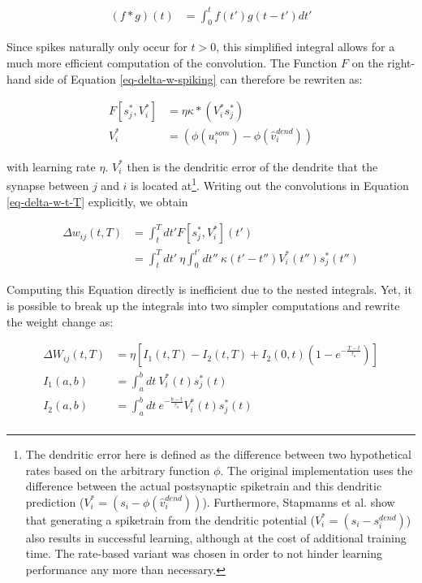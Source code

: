 \begin{align}
  (f \ast g)(t) & = \int_{0}^{t} f(t') g(t-t') d t'
\end{align}

Since spikes naturally only occur for $t>0$, this simplified integral allows for a much more efficient computation of the
convolution. The Function $F$ on the right-hand side of Equation \ref{eq-delta-w-spiking} can therefore
be rewriten as:

\begin{align}
  F[s_j^\ast, V_i^\ast] & = \eta \kappa \ast (V_i^\ast s_j^\ast)        \\
  V_i^\ast              & = (\phi(u_i^{som}) - \phi(\hat{v}_i^{dend}) )
\end{align}

 with learning rate $\eta$. $V_i^\ast$ then is the dendritic error of the dendrite that the synapse
between $j$ and $i$ is located at\footnote{The dendritic error here is defined as the difference between two
hypothetical rates based on the arbitrary function $\phi$. The original implementation uses the difference between the
actual postsynaptic spiketrain and this dendritic prediction ($V_i^\ast = (s_i - \phi(\hat{v}_i^{dend}) )$).
Furthermore, Stapmanns et al. show that generating a spiketrain from the dendritic potential ($V_i^\ast = (s_i -
s_i^{dend})$) also results in successful learning, although at the cost of additional training time. The rate-based
variant was chosen in order to not hinder learning performance any more than necessary.}. Writing out the convolutions
in Equation \ref{eq-delta-w-t-T} explicitly, we obtain

\begin{align}
  \Delta w_{ij}(t,T) & = \int_t^T dt' F[s_j^\ast, V_i^\ast](t')                                                                           \\
                     & =  \int_t^T dt' \  \eta\int_0^{t'} dt'' \ \kappa(t'-t'') V_i^\ast (t'') s_j^\ast (t'') \label{eq-delta-w-t-T-long}
\end{align}

Computing this Equation directly is inefficient due to the nested integrals. Yet, it is possible to break up the
integrals into two simpler computations and rewrite the weight change as:


\begin{align}
  \Delta W_{ij}(t, T) & = \eta \left[ I_1 (t, T) - I_2(t,T) + I_2(0,t)\left( 1- e^{-\frac{T-t}{\tau_\kappa}} \right) \right] \\
  I_1(a, b)           & = \int_{a}^{b} dt \ V_i^\ast (t) s_j^\ast (t)                                                        \\
  I_2(a, b)           & = \int_{a}^{b} dt \ e^{-\frac{b-t}{\tau_\kappa}} V_i^\ast (t) s_j^\ast (t)                           \\
\end{align}

